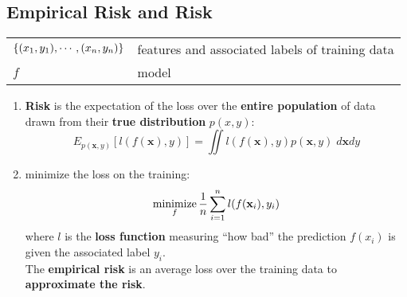\subsection{Empirical Risk and Risk \cite{dnn-1}} \label{Empirical Risk and Risk}

\begin{customTableWrapper}{1.5}
\begin{table}[H]
    \centering
    \begin{tabular}{l p{7cm}}
        $\left\{(x_1, y_1), \cdots,(x_n, y_n)\right\}$ & features and associated labels of training data \\

        $f$ & model \\
    \end{tabular}
\end{table}
\end{customTableWrapper}

\begin{enumerate}[itemsep=0.2cm]
    \item \textbf{Risk} is the expectation of the loss over the \textbf{entire population} of data drawn from their \textbf{true distribution} $p(x, y)$:
    \[
        E_{p(\mathbf{x}, y)} [l(f(\mathbf{x}), y)] = \iint l(f(\mathbf{x}), y) p(\mathbf{x}, y) \;d\mathbf{x}dy
    \]
    
    \item minimize the loss on the training: 
    \[
        \displaystyle\mathop{\mathrm{minimize}}_f \dfrac{1}{n} 
        \displaystyle\sum_{i=1}^n l(f(\mathbf{x}_i), y_i)
    \]
    where $l$ is the \textbf{loss function} measuring “how bad” the prediction $f(x_i)$ is given the associated label $y_i$. \\
    The \textbf{empirical risk} is an average loss over the training data to \textbf{approximate the risk}.
    
\end{enumerate}
















